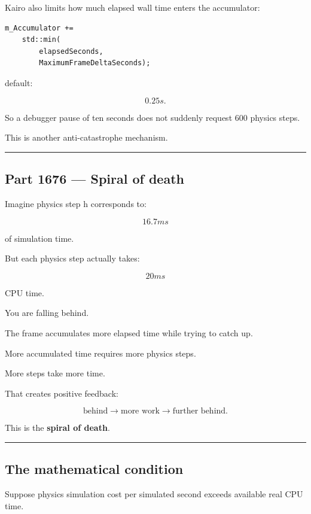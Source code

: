 Kairo also limits how much elapsed wall time enters the accumulator:

\begin{verbatim}
m_Accumulator +=
    std::min(
        elapsedSeconds,
        MaximumFrameDeltaSeconds);
\end{verbatim}

default:

\[
0.25s.
\]

So a debugger pause of ten seconds does not suddenly request 600 physics steps.

This is another anti-catastrophe mechanism.

\begin{center}\rule{0.5\linewidth}{0.5pt}\end{center}

\subsection{Part 1676 --- Spiral of death}\label{06-engine-ii-ch037-part-1676-spiral-of-death}

Imagine physics step h corresponds to:

\[
16.7ms
\]

of simulation time.

But each physics step actually takes:

\[
20ms
\]

CPU time.

You are falling behind.

The frame accumulates more elapsed time while trying to catch up.

More accumulated time requires more physics steps.

More steps take more time.

That creates positive feedback:

\[
\boxed{
\text{behind}
\rightarrow
\text{more work}
\rightarrow
\text{further behind}.
}
\]

This is the \textbf{spiral of death}.

\begin{center}\rule{0.5\linewidth}{0.5pt}\end{center}

\subsection{The mathematical condition}\label{06-engine-ii-ch037-the-mathematical-condition}

Suppose physics simulation cost per simulated second exceeds available real CPU time.

